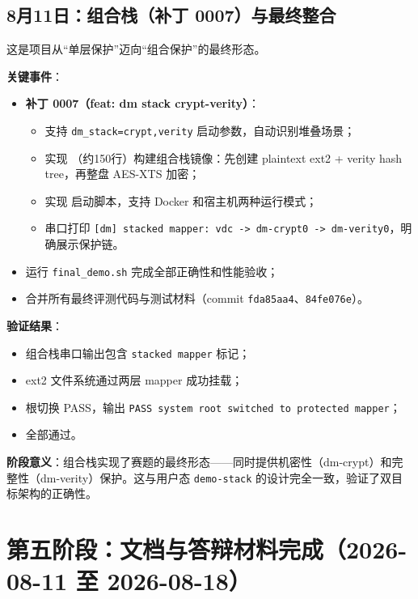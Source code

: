 \subsection{8月11日：组合栈（补丁 0007）与最终整合}

这是项目从“单层保护”迈向“组合保护”的最终形态。

\textbf{关键事件}：
\begin{itemize}
    \item \textbf{补丁 0007（feat: dm stack crypt-verity）}：
    \begin{itemize}
        \item 支持 \texttt{dm\_stack=crypt,verity} 启动参数，自动识别堆叠场景；
        \item 实现 \texttt{}（约150行）构建组合栈镜像：先创建 plaintext ext2 + verity hash tree，再整盘 AES-XTS 加密；
        \item 实现 \texttt{} 启动脚本，支持 Docker 和宿主机两种运行模式；
        \item 串口打印 \texttt{[dm] stacked mapper: vdc -> dm-crypt0 -> dm-verity0}，明确展示保护链。
    \end{itemize}
    \item 运行 \texttt{final\_demo.sh} 完成全部正确性和性能验收；
    \item 合并所有最终评测代码与测试材料（commit \texttt{fda85aa4}、\texttt{84fe076e}）。
\end{itemize}

\textbf{验证结果}：
\begin{itemize}
    \item 组合栈串口输出包含 \texttt{stacked mapper} 标记；
    \item ext2 文件系统通过两层 mapper 成功挂载；
    \item 根切换 PASS，输出 \texttt{PASS system root switched to protected mapper}；
    \item \texttt{} 全部通过。
\end{itemize}

\textbf{阶段意义}：组合栈实现了赛题的最终形态——同时提供机密性（dm-crypt）和完整性（dm-verity）保护。这与用户态 \texttt{demo-stack} 的设计完全一致，验证了双目标架构的正确性。

\section{第五阶段：文档与答辩材料完成（2026-08-11 至 2026-08-18）}

